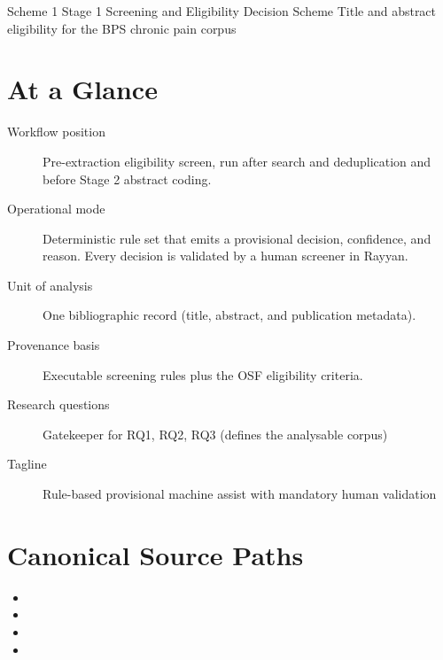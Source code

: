 \documentclass[11pt]{article}
\begin{document}
\schemeheader
  {Scheme 1}
  {Stage 1 Screening and Eligibility Decision Scheme}
  {Title and abstract eligibility for the BPS chronic pain corpus}


\section*{At a Glance}
\begin{description}
\item[Workflow position] Pre-extraction eligibility screen, run after search and deduplication and before Stage 2 abstract coding.
\item[Operational mode] Deterministic rule set that emits a provisional decision, confidence, and reason. Every decision is validated by a human screener in Rayyan.
\item[Unit of analysis] One bibliographic record (title, abstract, and publication metadata).
\item[Provenance basis] Executable screening rules plus the OSF eligibility criteria.
\item[Research questions] Gatekeeper for RQ1, RQ2, RQ3 (defines the analysable corpus)
\item[Tagline] Rule-based provisional machine assist with mandatory human validation
\end{description}

\section*{Canonical Source Paths}
\begin{itemize}
\item {}
\item {}
\item {}
\item {}
\end{itemize}
\end{document}

